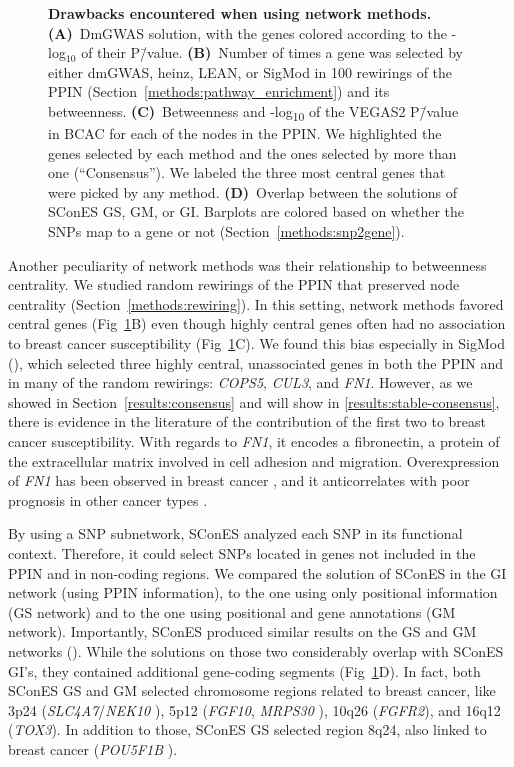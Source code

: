 \documentclass[10pt,letterpaper]{article}
\begin{document}
\begin{figure}[!ht]
  \centering
  \caption{\textbf{Drawbacks encountered when using network methods.} \textbf{(A)}~DmGWAS solution, with the genes colored according to the -log$_{10}$ of their P\=/value. \textbf{(B)}~Number of times a gene was selected by either dmGWAS, heinz, LEAN, or SigMod in 100 rewirings of the PPIN (Section~\ref{methods:pathway_enrichment}) and its betweenness. \textbf{(C)}~Betweenness and -log\textsubscript{10} of the VEGAS2 P\=/value in BCAC for each of the nodes in the PPIN. We highlighted the genes selected by each method and the ones selected by more than one (``Consensus''). We labeled the three most central genes that were picked by any method. \textbf{(D)}~Overlap between the solutions of SConES GS, GM, or GI. Barplots are colored based on whether the SNPs map to a gene or not (Section~\ref{methods:snp2gene}).}
  \label{fig:issues}
  \end{figure}

Another peculiarity of network methods was their relationship to betweenness centrality. We studied random rewirings of the PPIN that preserved node centrality (Section~\ref{methods:rewiring}). In this setting, network methods favored central genes (Fig~\ref{fig:issues}B) even though highly central genes often had no association to breast cancer susceptibility (Fig~\ref{fig:issues}C). We found this bias especially in SigMod (), which selected three highly central, unassociated genes in both the PPIN and in many of the random rewirings: \emph{COPS5}, \emph{CUL3}, and \emph{FN1}. However, as we showed in Section~\ref{results:consensus} and will show in \ref{results:stable-consensus}, there is evidence in the literature of the contribution of the first two to breast cancer susceptibility. With regards to \emph{FN1}, it encodes a fibronectin, a protein of the extracellular matrix involved in cell adhesion and migration. Overexpression of \emph{FN1} has been observed in breast cancer \cite{Ioachim2002}, and it anticorrelates with poor prognosis in other cancer types \cite{Yi2016,Sponziello2016}.

By using a SNP subnetwork, SConES analyzed each SNP in its functional context. Therefore, it could select SNPs located in genes not included in the PPIN and in non-coding regions. We compared the solution of SConES in the GI network (using PPIN information), to the one using only positional information (GS network) and to the one using positional and gene annotations (GM network). Importantly, SConES produced similar results on the GS and GM networks (). While the solutions on those two considerably overlap with SConES GI's, they contained additional gene-coding segments (Fig~\ref{fig:issues}D). In fact, both SConES GS and GM selected chromosome regions related to breast cancer, like 3p24 (\emph{SLC4A7}/\emph{NEK10} \cite{ahmed_newly_2009}), 5p12 (\emph{FGF10}, \emph{MRPS30} \cite{quigley_5p12_2014}), 10q26 (\emph{FGFR2}), and 16q12 (\emph{TOX3}). In addition to those, SConES GS selected region 8q24, also linked to breast cancer (\emph{POU5F1B} \cite{breyer_expressed_2014}). 
\end{document}
